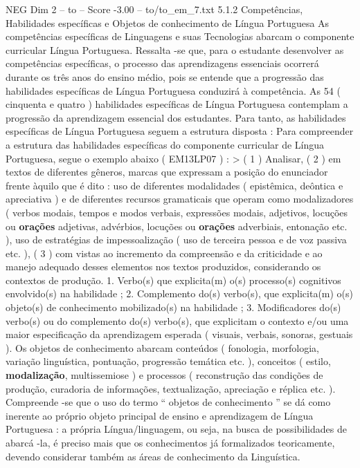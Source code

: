 \begin{textsample}{NEG Dim 2 – to – Score -3.00 – to/to\_em\_7.txt}  \label{ex:f2_neg_158}
5.1.2 Competências, Habilidades específicas e Objetos de conhecimento de Língua Portuguesa As competências específicas de Linguagens e suas Tecnologias abarcam o componente curricular Língua Portuguesa.
Ressalta -se que, para o estudante desenvolver as competências específicas, o processo das aprendizagens essenciais ocorrerá durante os três anos do ensino médio, pois se entende que a progressão das habilidades específicas de Língua Portuguesa conduzirá à competência.
As 54 ( cinquenta e quatro ) habilidades específicas de Língua Portuguesa contemplam a progressão da aprendizagem essencial dos estudantes.
Para tanto, as habilidades específicas de Língua Portuguesa seguem a estrutura disposta : Para compreender a estrutura das habilidades específicas do componente curricular de Língua Portuguesa, segue o exemplo abaixo ( EM13LP07 ) : > ( 1 ) Analisar, ( 2 ) em textos de diferentes gêneros, marcas que expressam a posição do enunciador frente àquilo que é dito : uso de diferentes modalidades ( epistêmica, deôntica e apreciativa ) e de diferentes recursos gramaticais que operam como modalizadores ( verbos modais, tempos e modos verbais, expressões modais, adjetivos, locuções ou \textbf{orações} adjetivas, advérbios, locuções ou \textbf{orações} adverbiais, entonação etc. ), uso de estratégias de impessoalização ( uso de terceira pessoa e de voz passiva etc. ), ( 3 ) com vistas ao incremento da compreensão e da criticidade e ao manejo adequado desses elementos nos textos produzidos, considerando os contextos de produção. 1.
Verbo(s) que explicita(m) o(s) processo(s) cognitivos envolvido(s) na habilidade ; 2.
Complemento do(s) verbo(s), que explicita(m) o(s) objeto(s) de conhecimento mobilizado(s) na habilidade ; 3.
Modificadores do(s) verbo(s) ou do complemento do(s) verbo(s), que explicitam o contexto e/ou uma maior especificação da aprendizagem esperada ( visuais, verbais, sonoras, gestuais ).
Os objetos de conhecimento abarcam conteúdos ( fonologia, morfologia, variação linguística, pontuação, progressão temática etc. ), conceitos ( estilo, \textbf{modalização}, multissemiose ) e processos ( reconstrução das condições de produção, curadoria de informações, textualização, apreciação e réplica etc. ).
Compreende -se que o uso do termo “ objetos de conhecimento ” se dá como inerente ao próprio objeto principal de ensino e aprendizagem de Língua Portuguesa : a própria Língua/linguagem, ou seja, na busca de possibilidades de abarcá -la, é preciso mais que os conhecimentos já formalizados teoricamente, devendo considerar também as áreas de conhecimento da Linguística.

\end{textsample}
